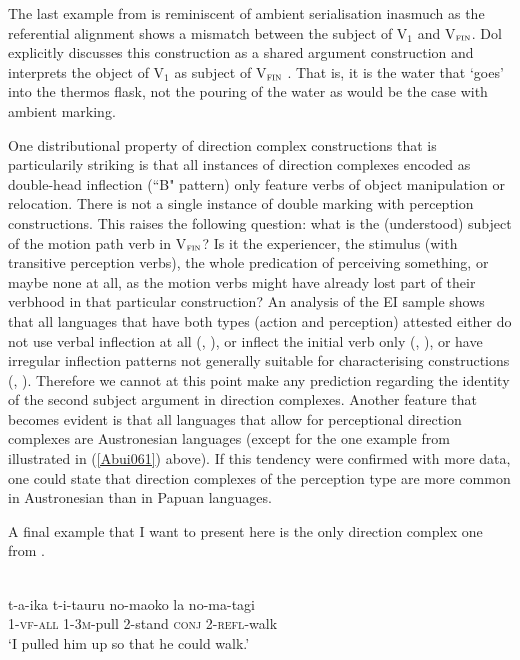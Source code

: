 The last example from  is reminiscent of ambient serialisation inasmuch as the referential alignment shows a mismatch between the subject of V$_{1}$ and V$_{\textsc{fin}}$. Dol explicitly discusses this construction as a shared argument construction and interprets the object of V$_{1}$ as subject of V$_{\textsc{fin}}$ \citep[217]{dol2007grammar}. That is, it is the water that `goes' into the thermos flask, not the pouring of the water as would be the case with ambient marking. 

One distributional property of direction complex constructions that is particularily striking is that all instances of direction complexes encoded as double-head inflection (``B" pattern) only feature verbs of object manipulation or relocation. There is not a single instance of double marking with perception constructions. This raises the following question: what is the (understood) subject of the motion path verb in V$_{\textsc{fin}}$? Is it the experiencer, the stimulus (with transitive perception verbs), the whole predication of perceiving something, or maybe none at all, as the motion verbs might have already lost part of their verbhood in that particular construction? An analysis of the EI sample shows that all languages that have both types (action and perception) attested either do not use verbal inflection at all (, ), or inflect the initial verb only (, ), or have irregular inflection patterns not generally suitable for characterising constructions (, ). Therefore we cannot at this point make any prediction regarding the identity of the second subject argument in direction complexes. Another feature that becomes evident is that all languages that allow for perceptional direction complexes are Austronesian languages (except for the one example from  illustrated in (\ref{Abui061}) above). If this tendency were confirmed with more data, one could state that direction complexes of the perception type are more common in Austronesian than in Papuan languages.

A final example that I want to present here is the only direction complex one from . 

\ea \label{Tobelo033}
\\
\gll t-a-ika t-i-tauru no-maoko la no-ma-tagi \\
\textsc{1}-\textsc{vf}-\textsc{all} \textsc{1}-\textsc{3}\textsc{m}-pull \textsc{2}-stand \textsc{conj} \textsc{2}-\textsc{refl}-walk \\
\glft `I pulled him up so that he could walk.' \\ 
\z


